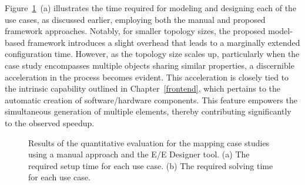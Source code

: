      
     Figure~\ref{mapping_use_cases_setup_time}~(a) illustrates the time required for modeling and designing each of the use cases, as discussed earlier, employing both the manual and proposed framework approaches. Notably, for smaller topology sizes, the proposed model-based framework introduces a slight overhead that leads to a marginally extended configuration time. However, as the topology size scales up, particularly when the case study encompasses multiple objects sharing similar properties, a discernible acceleration in the process becomes evident.
     This acceleration is closely tied to the intrinsic capability outlined in Chapter~\ref{frontend}, which pertains to the automatic creation of software/hardware components. This feature empowers the simultaneous generation of multiple elements, thereby contributing significantly to the observed speedup.

    \begin{figure}[t]
	\centering
	\caption{Results of the quantitative evaluation for the mapping case studies using a manual approach and the E/E Designer tool. (a) The required setup time for each use case. (b) The required solving time for each use case.}
	\label{mapping_use_cases_setup_time}
    \end{figure}
    
